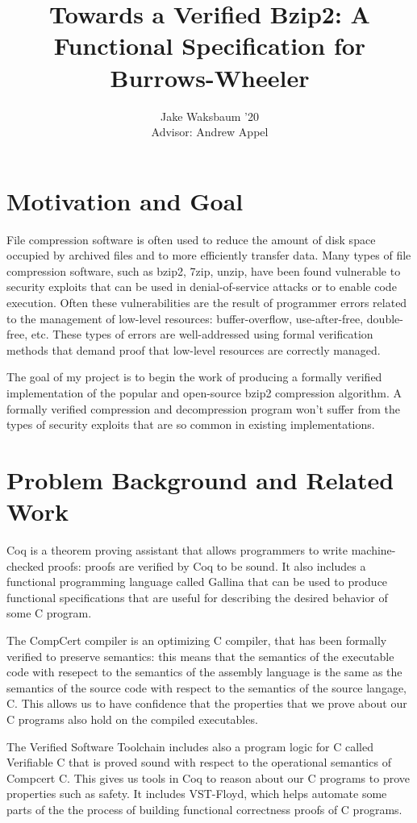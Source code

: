 \documentclass{article}
\title{Towards a Verified Bzip2: A Functional Specification for Burrows-Wheeler}
\author{Jake Waksbaum '20\\Advisor: Andrew Appel}
\date{}
\begin{document}
\maketitle

\section{Motivation and Goal}
File compression software is often used to reduce the amount of disk
space occupied by archived files and to more efficiently transfer
data. Many types of file compression software, such as bzip2, 7zip,
unzip, have been found vulnerable to security exploits that can be
used in denial-of-service attacks or to enable code execution. Often
these vulnerabilities are the result of programmer errors related to
the management of low-level resources: buffer-overflow,
use-after-free, double-free, etc. These types of errors are
well-addressed using formal verification methods that demand proof
that low-level resources are correctly managed.

The goal of my project is to begin the work of producing a formally
verified implementation of the popular and open-source bzip2
compression algorithm. A formally verified compression and
decompression program won't suffer from the types of security exploits
that are so common in existing implementations.

\section{Problem Background and Related Work}
Coq is a theorem proving assistant that allows programmers to write
machine-checked proofs: proofs are verified by Coq to be sound. It
also includes a functional programming language called Gallina that
can be used to produce functional specifications\cite{7536361} that
are useful for describing the desired behavior of some C program.

The CompCert
compiler\cite{Stewart:2015:CC:2676726.2676985,leroy:inria-00000963} is
an optimizing C compiler, that has been formally verified to preserve
semantics: this means that the semantics of the executable code with
resepect to the semantics of the assembly language is the same as the
semantics of the source code with respect to the semantics of the
source langage, C. This allows us to have confidence that the
properties that we prove about our C programs also hold on the
compiled executables.

The Verified Software
Toolchain\cite{Appel:2011:VST:1987211.1987212,Appel:2014:PLC:2670099}
includes also a program logic for C called Verifiable C that is proved
sound with respect to the operational semantics of Compcert C. This
gives us tools in Coq to reason about our C programs to prove
properties such as safety. It includes
VST-Floyd\cite{cao2018vst-floyd:}, which helps automate some parts of
the the process of building functional correctness proofs of C
programs.
\end{document}
